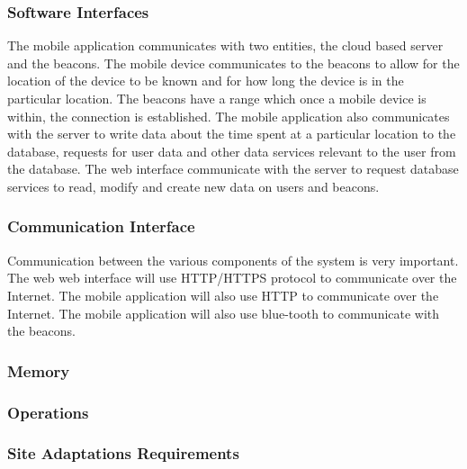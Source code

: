 \documentclass[11pt]{article}
\begin{document}
\subsubsection{Software Interfaces}
The mobile application communicates with two entities, the cloud based server and the beacons. The mobile device communicates to the beacons to allow for the location of the device to be known and for how long the device is in the particular location. The beacons have a range which once a mobile device is within, the connection is established. The mobile application also communicates with the server to write data about the time spent at a particular location to the database, requests for user data and other data services relevant to the user from the database.
The web interface communicate with the server to request database services to read, modify and create new data on users and beacons. 
\subsubsection{Communication Interface}
Communication between the various components of the system is very important. The web web interface will use HTTP/HTTPS protocol to communicate over the Internet. The mobile application will also use HTTP to communicate over the Internet. The mobile  application will also use blue-tooth to communicate with the beacons.
\subsubsection{Memory}
\subsubsection{Operations}
\subsubsection{Site Adaptations Requirements}
\end{document}
